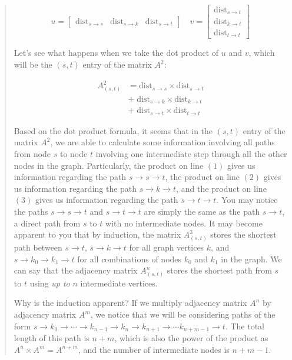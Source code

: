 \documentclass[12pt]{article}
\begin{document}
\begin{quote}
    \[
        u =
        \begin{bmatrix}
            \mathrm{dist}_{s \to s} & \mathrm{dist}_{s \to k} & \mathrm{dist}_{s \to t}
        \end{bmatrix}
        \quad
        v =
        \begin{bmatrix}
            \mathrm{dist}_{s \to t} \\
            \mathrm{dist}_{k \to t} \\
            \mathrm{dist}_{t \to t}
        \end{bmatrix}
    \]

    Let's see what happens when we take the dot product of $u$ and $v$, which will be the $(s, t)$ entry of the matrix $A^2$:

    \begin{eqnarray}
        A^2_{(s,t)}
        &= \mathrm{dist}_{s \to s} \times \mathrm{dist}_{s \to t} \\
        &+ \; \mathrm{dist}_{s \to k} \times \mathrm{dist}_{k \to t} \\
        &+ \; \mathrm{dist}_{s \to t} \times \mathrm{dist}_{t \to t}
    \end{eqnarray}

    Based on the dot product formula, it seems that in the $(s, t)$ entry of the matrix $A^2$, we are able to calculate some information involving all paths from node $s$ to node $t$ involving one intermediate step through all the other nodes in the graph. Particularly, the product on line $(1)$ gives us information regarding the path $s \to s \to t$, the product on line $(2)$ gives us information regarding the path $s \to k \to t$, and the product on line $(3)$ gives us information regarding the path $s \to t \to t$. You may notice the paths $s \to s \to t$ and $s \to t \to t$ are simply the same as the path $s \to t$, a direct path from $s$ to $t$ with no intermediate nodes. It may become apparent to you that by induction, the matrix $A^3_{(s, t)}$ stores the shortest path between $s \to t$, $s \to k \to t$ for all graph vertices $k$, and $s \to k_0 \to k_1 \to t$ for all combinations of nodes $k_0$ and $k_1$ in the graph. We can say that the adjacency matrix $A^n_{(s, t)}$ stores the shortest path from $s$ to $t$ using \emph{up to} $n$ intermediate vertices.

    {\footnotesize Why is the induction apparent? If we multiply adjacency matrix $A^n$ by adjacency matrix $A^m$, we notice that we will be considering paths of the form $s \to k_0 \to \cdots \to k_{n - 1} \to k_{n} \to k_{n + 1} \to \cdots k_{n + m - 1} \to t$. The total length of this path is $n + m$, which is also the power of the product as $A^n \times A^m = A^{n + m}$, and the number of intermediate nodes is $n + m - 1$.}
\end{quote}
\end{document}
